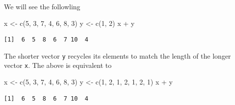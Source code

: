 \documentclass[
  letterpaper,
  DIV=11,
  numbers=noendperiod]{scrreprt}
\newenvironment{Shaded}{\begin{snugshade}}{\end{snugshade}}
\newcommand{\DecValTok}[1]{\textcolor[rgb]{0.68,0.00,0.00}{#1}}
\newcommand{\FunctionTok}[1]{\textcolor[rgb]{0.28,0.35,0.67}{#1}}
\newcommand{\NormalTok}[1]{\textcolor[rgb]{0.00,0.23,0.31}{#1}}
\newcommand{\OtherTok}[1]{\textcolor[rgb]{0.00,0.23,0.31}{#1}}
\newcommand{\SpecialCharTok}[1]{\textcolor[rgb]{0.37,0.37,0.37}{#1}}
\begin{document}
\begin{tcolorbox}[enhanced jigsaw, colbacktitle=quarto-callout-tip-color!10!white, opacitybacktitle=0.6, breakable, left=2mm, leftrule=.75mm, toprule=.15mm, toptitle=1mm, bottomtitle=1mm, colframe=quarto-callout-tip-color-frame, opacityback=0, coltitle=black, arc=.35mm, titlerule=0mm, colback=white, bottomrule=.15mm, title=\textcolor{quarto-callout-tip-color}{\faLightbulb}\hspace{0.5em}{Answer}, rightrule=.15mm]

We will see the followling

\begin{Shaded}
\begin{Highlighting}[]
\NormalTok{x }\OtherTok{\textless{}{-}} \FunctionTok{c}\NormalTok{(}\DecValTok{5}\NormalTok{, }\DecValTok{3}\NormalTok{, }\DecValTok{7}\NormalTok{, }\DecValTok{4}\NormalTok{, }\DecValTok{6}\NormalTok{, }\DecValTok{8}\NormalTok{, }\DecValTok{3}\NormalTok{)}
\NormalTok{y }\OtherTok{\textless{}{-}} \FunctionTok{c}\NormalTok{(}\DecValTok{1}\NormalTok{, }\DecValTok{2}\NormalTok{)}
\NormalTok{x }\SpecialCharTok{+}\NormalTok{ y}
\end{Highlighting}
\end{Shaded}

\begin{verbatim}
[1]  6  5  8  6  7 10  4
\end{verbatim}

The shorter vector \texttt{y} recycles its elements to match the length
of the longer vector \texttt{x}. The above is equivalent to

\begin{Shaded}
\begin{Highlighting}[]
\NormalTok{x }\OtherTok{\textless{}{-}} \FunctionTok{c}\NormalTok{(}\DecValTok{5}\NormalTok{, }\DecValTok{3}\NormalTok{, }\DecValTok{7}\NormalTok{, }\DecValTok{4}\NormalTok{, }\DecValTok{6}\NormalTok{, }\DecValTok{8}\NormalTok{, }\DecValTok{3}\NormalTok{)}
\NormalTok{y }\OtherTok{\textless{}{-}} \FunctionTok{c}\NormalTok{(}\DecValTok{1}\NormalTok{, }\DecValTok{2}\NormalTok{, }\DecValTok{1}\NormalTok{, }\DecValTok{2}\NormalTok{, }\DecValTok{1}\NormalTok{, }\DecValTok{2}\NormalTok{, }\DecValTok{1}\NormalTok{)}
\NormalTok{x }\SpecialCharTok{+}\NormalTok{ y}
\end{Highlighting}
\end{Shaded}

\begin{verbatim}
[1]  6  5  8  6  7 10  4
\end{verbatim}

\end{tcolorbox}
\end{document}
